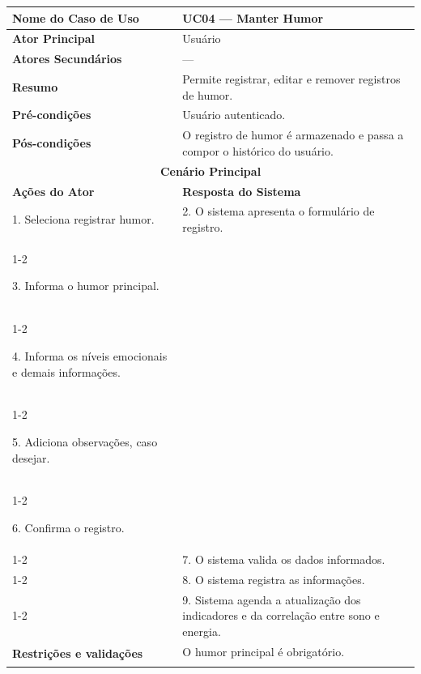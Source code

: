 
\begin{longtable}{| p{} | p{} |}
\hline

\textbf{Nome do Caso de Uso} &
UC04 --- Manter Humor \\
\hline

\textbf{Ator Principal} &
Usuário \\
\hline

\textbf{Atores Secundários} &
--- \\
\hline

\textbf{Resumo} &
Permite registrar, editar e remover registros de humor. \\
\hline

\textbf{Pré-condições} &
Usuário autenticado. \\
\hline

\textbf{Pós-condições} &
O registro de humor é armazenado e passa a compor o histórico do usuário. \\
\hline

\multicolumn{2}{|c|}{\textbf{Cenário Principal}}\\
\hline

\textbf{Ações do Ator} &
\textbf{Resposta do Sistema} \\
\hline

1. Seleciona registrar humor. &
2. O sistema apresenta o formulário de registro. \\
\cline{1-2}

3. Informa o humor principal. &
\\
\cline{1-2}

4. Informa os níveis emocionais e demais informações. &
\\
\cline{1-2}

5. Adiciona observações, caso desejar. &
\\
\cline{1-2}

6. Confirma o registro. & \\
\cline{1-2}

&
7. O sistema valida os dados informados. \\
\cline{1-2}

&
8. O sistema registra as informações. \\
\cline{1-2}

&
9. Sistema agenda a atualização dos indicadores e da correlação
entre sono e energia. \\
\hline

\multirow{3}{.40\textwidth}{\textbf{Restrições e validações}}
&
O humor principal é obrigatório. \\
\cline{2-2}


\end{longtable}
